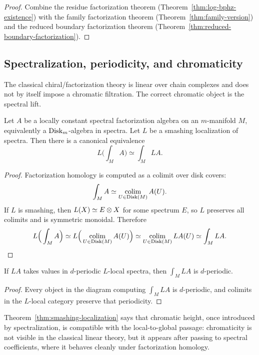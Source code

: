 \begin{proof}
Combine the residue factorization theorem (Theorem~\ref{thm:log-bphz-existence}) with the family factorization theorem (Theorem~\ref{thm:family-version}) and the reduced boundary factorization theorem (Theorem~\ref{thm:reduced-boundary-factorization}).
\end{proof}

\subsection{Spectralization, periodicity, and chromaticity}
The classical chiral/factorization theory is linear over chain complexes and does not by itself impose a chromatic filtration. The correct chromatic object is the spectral lift.

\begin{theorem}\label{thm:smashing-localization}
Let $A$ be a locally constant spectral factorization algebra on an $m$-manifold $M$, equivalently a $\mathrm{Disk}_m$-algebra in spectra. Let $L$ be a smashing localization of spectra. Then there is a canonical equivalence
\[
 L\Big(\int_M A\Big) \simeq \int_M LA.
\]
\end{theorem}

\begin{proof}
Factorization homology is computed as a colimit over disk covers:
\[
 \int_M A \simeq \operatorname*{colim}_{U\in \mathrm{Disk}(M)} A(U).
\]
If $L$ is smashing, then $L(X)\simeq E\otimes X$ for some spectrum $E$, so $L$ preserves all colimits and is symmetric monoidal. Therefore
\[
 L\Big(\int_M A\Big)
 \simeq
 L\Big(\operatorname*{colim}_{U\in \mathrm{Disk}(M)}A(U)\Big)
 \simeq
 \operatorname*{colim}_{U\in \mathrm{Disk}(M)}LA(U)
 \simeq
 \int_M LA.
\]
\end{proof}

\begin{corollary}\label{cor:periodicity}
If $LA$ takes values in $d$-periodic $L$-local spectra, then $\int_M LA$ is $d$-periodic.
\end{corollary}

\begin{proof}
Every object in the diagram computing $\int_M LA$ is $d$-periodic, and colimits in the $L$-local category preserve that periodicity.
\end{proof}

\begin{remark}[Chromaticity]
Theorem~\ref{thm:smashing-localization} says that chromatic height, once introduced by spectralization, is compatible with the local-to-global passage: chromaticity is not visible in the classical linear theory, but it appears after passing to spectral coefficients, where it behaves cleanly under factorization homology.
\end{remark}


